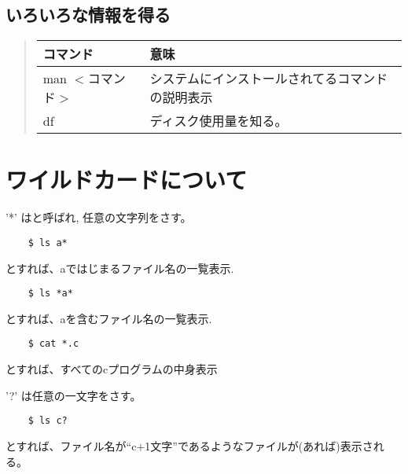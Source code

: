 \documentclass{jreport}
\begin{document}

\subsection{いろいろな情報を得る}

\begin{quote}
\begin{tabular}[t]{ll}\hline
コマンド & 意味 \\ \hline
man $<$コマンド$>$ & システムにインストールされてるコマンドの説明表示 \\
df & ディスク使用量を知る。 \\
\hline
\end{tabular}
\end{quote}



\section{ワイルドカードについて}
'*' はと呼ばれ, 任意の文字列をさす。
\begin{screen}
\begin{verbatim}
    $ ls a*
\end{verbatim}
\end{screen}
とすれば、aではじまるファイル名の一覧表示.
\begin{screen}
\begin{verbatim}
    $ ls *a*
\end{verbatim}
\end{screen}
とすれば、aを含むファイル名の一覧表示.
\begin{screen}
\begin{verbatim}
    $ cat *.c
\end{verbatim}
\end{screen}
とすれば、すべてのcプログラムの中身表示

'?' は任意の一文字をさす。
\begin{screen}
\begin{verbatim}
    $ ls c?
\end{verbatim}
\end{screen}
とすれば、ファイル名が``c$+$1文字''であるようなファイルが(あれば)表示される。
\end{document}
